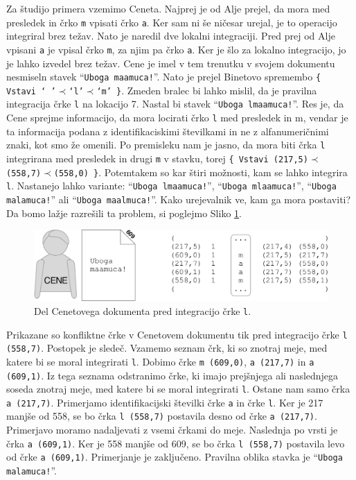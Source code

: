 \documentclass[a4paper, 12pt, twoside]{book}
\begin{document}
Za študijo primera vzemimo Ceneta. Najprej je od Alje prejel, da mora med presledek in črko {\tt m} vpisati črko {\tt a}. Ker sam ni še ničesar urejal, je to operacijo integriral brez težav. Nato je naredil dve lokalni integraciji. Pred prej od Alje vpisani {\tt a} je vpisal črko {\tt m}, za njim pa črko {\tt a}. Ker je šlo za lokalno integracijo, jo je lahko izvedel brez težav. Cene je imel v tem trenutku v svojem dokumentu nesmiseln stavek “{\tt Uboga maamuca!}”. Nato je prejel Binetovo spremembo {\tt \{ Vstavi ‘ ’$\prec$‘l’$\prec$‘m’ \}}. Zmeden bralec bi lahko mislil, da je pravilna integracija črke {\tt l} na lokacijo 7. Nastal bi stavek “{\tt Uboga lmaamuca!}”. Res je, da Cene sprejme informacijo, da mora locirati črko {\tt l} med presledek in m, vendar je ta informacija podana z identifikaciskimi številkami in ne z alfanumeričnimi znaki, kot smo že omenili. Po premisleku nam je jasno, da mora biti črka {\tt l} integrirana med presledek in drugi {\tt m} v stavku, torej {\tt \{ Vstavi (217,5)$\prec$(558,7)$\prec$(558,0) \}}. Potemtakem so kar štiri možnosti, kam se lahko integrira {\tt l}. Nastanejo lahko variante: “{\tt Uboga lmaamuca!}”, “{\tt Uboga mlaamuca!}”, “{\tt Uboga malamuca!}” ali “{\tt Uboga maalmuca!}”. Kako urejevalnik ve, kam ga mora postaviti? Da bomo lažje razrešili ta problem, si poglejmo Sliko \ref{woot7}.

\begin{figure}[placement h]
\begin{center}
\includegraphics[width=13cm]{img/woot7.pdf}
\end{center}
\caption{Del Cenetovega dokumenta pred integracijo črke {\tt l}.}
\label{woot7}
\end{figure}

Prikazane so konfliktne črke v Cenetovem dokumentu tik pred integracijo črke {\tt l (558,7)}. Postopek je sledeč. Vzamemo seznam črk, ki so znotraj meje, med katere bi se moral integrirati {\tt l}. Dobimo črke {\tt m (609,0)}, {\tt a (217,7)} in {\tt a (609,1)}. Iz tega seznama odstranimo črke, ki imajo prejšnjega ali naslednjega soseda znotraj meje, med katere bi se moral integrirati {\tt l}. Ostane nam samo črka {\tt a (217,7)}. Primerjamo identifikacijski številki črke {\tt a} in črke {\tt l}. Ker je 217 manjše od 558, se bo črka {\tt l (558,7)} postavila desno od črke {\tt a (217,7)}. Primerjavo moramo nadaljevati z vsemi črkami do meje. Naslednja po vrsti je črka {\tt a (609,1)}. Ker je 558 manjše od 609, se bo črka {\tt l (558,7)} postavila levo od črke {\tt a (609,1)}. Primerjanje je zaključeno. Pravilna oblika stavka je “{\tt Uboga malamuca!}”.
\end{document}
